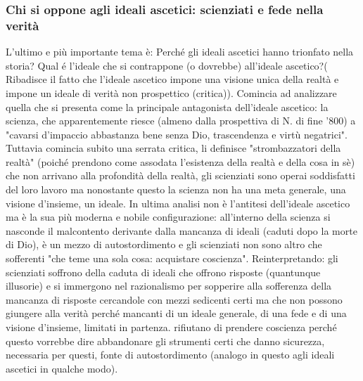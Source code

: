 \documentclass[10pt,a4paper]{article}
\begin{document}
\subsubsection{Chi si oppone agli ideali ascetici: scienziati e fede nella verità}
L'ultimo e più importante tema è: Perché gli ideali ascetici hanno trionfato nella storia? Qual é l'ideale che si contrappone (o dovrebbe) all'ideale ascetico?( Ribadisce il fatto che l'ideale ascetico impone una visione unica della realtà e impone un ideale di verità non prospettico (critica)). Comincia ad analizzare quella che si presenta come la principale antagonista dell'ideale ascetico: la scienza, che apparentemente riesce (almeno dalla prospettiva di N. di fine '800) a "cavarsi d'impaccio abbastanza bene senza Dio, trascendenza e virtù negatrici". Tuttavia comincia subito una serrata critica, li definisce "strombazzatori della realtà" (poiché prendono come assodata l'esistenza della realtà e della cosa in sè) che non arrivano alla profondità della realtà, gli scienziati sono operai soddisfatti del loro lavoro ma nonostante questo la scienza non ha una meta generale, una visione d'insieme, un ideale. In ultima analisi non è l'antitesi dell'ideale ascetico ma è la sua più moderna e nobile configurazione: all'interno della scienza si nasconde il malcontento derivante dalla mancanza di ideali (caduti dopo la morte di Dio), è un mezzo di autostordimento e gli scienziati non sono altro che sofferenti "che teme una sola cosa: acquistare coscienza". Reinterpretando: gli scienziati soffrono della caduta di ideali che offrono risposte (quantunque illusorie) e si immergono nel razionalismo per sopperire alla sofferenza della mancanza di risposte cercandole con mezzi sedicenti certi ma che non possono giungere alla verità perché mancanti di un ideale generale, di una fede e di una visione d'insieme, limitati in partenza. rifiutano di prendere coscienza perché questo vorrebbe dire abbandonare gli strumenti certi che danno sicurezza, necessaria per questi, fonte di autostordimento (analogo in questo agli ideali ascetici in qualche modo).\\
\end{document}
